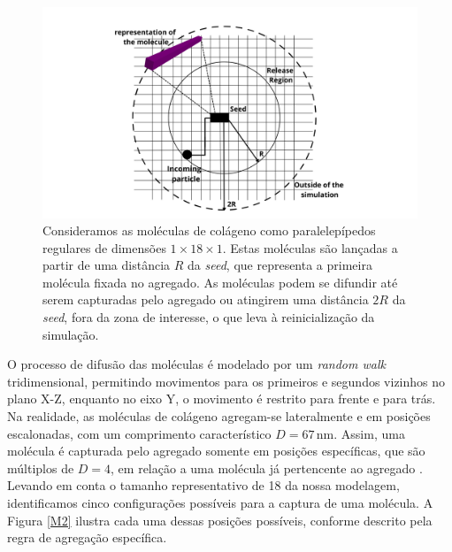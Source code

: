 \documentclass{article}
\begin{document}
        \begin{figure}[H]
            \centering
            \includegraphics[width=\textwidth]{figures/DLA.png}
    
            \caption{Consideramos as moléculas de colágeno como paralelepípedos regulares de dimensões \(1 \times 18 \times 1\). 
            Estas moléculas são lançadas a partir de uma distância \(R\) da \textit{seed}, que representa a primeira molécula fixada 
            no agregado. As moléculas podem se difundir até serem capturadas pelo agregado ou atingirem uma distância \(2R\) da \textit{seed}, 
            fora da zona de interesse, o que leva à reinicialização da simulação.} 
    
            \label{M1}
        \end{figure}
    
        O processo de difusão das moléculas é modelado por um \textit{random walk} tridimensional, permitindo movimentos para os primeiros e 
        segundos vizinhos no plano X-Z, enquanto no eixo Y, o movimento é restrito para frente e para trás. Na realidade, as moléculas de colágeno 
        agregam-se lateralmente e em posições escalonadas, com um comprimento característico \(D = 67 \, \text{nm}\). Assim, uma molécula é 
        capturada pelo agregado somente em posições específicas, que são múltiplos de \(D = 4\), em relação a uma molécula já pertencente ao 
        agregado \cite{Parkinson1995}. Levando em conta o tamanho representativo de 18 da nossa modelagem, identificamos cinco configurações 
        possíveis para a captura de uma molécula. A Figura \ref{M2} ilustra cada uma dessas posições possíveis, conforme descrito pela regra de 
        agregação específica. 
\end{document}
